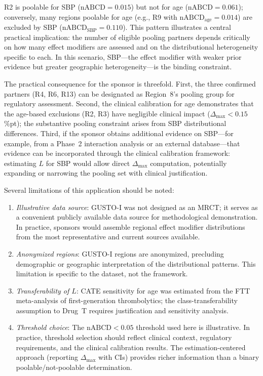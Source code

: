 R2 is poolable for SBP ($\text{nABCD} = 0.015$) but not for age ($\text{nABCD} = 0.061$); conversely, many regions poolable for age (e.g., R9 with $\text{nABCD}_{\text{age}} = 0.014$) are excluded by SBP ($\text{nABCD}_{\text{SBP}} = 0.110$). This pattern illustrates a central practical implication: the number of eligible pooling partners depends critically on how many effect modifiers are assessed and on the distributional heterogeneity specific to each. In this scenario, SBP---the effect modifier with weaker prior evidence but greater geographic heterogeneity---is the binding constraint.

The practical consequence for the sponsor is threefold. First, the three confirmed partners (R4, R6, R13) can be designated as Region~8's pooling group for regulatory assessment. Second, the clinical calibration for age demonstrates that the age-based exclusions (R2, R3) have negligible clinical impact ($\Delta_{\max} < 0.15$\%pt); the substantive pooling constraint arises from SBP distributional differences. Third, if the sponsor obtains additional evidence on SBP---for example, from a Phase~2 interaction analysis or an external database---that evidence can be incorporated through the clinical calibration framework: estimating $L$ for SBP would allow direct $\Delta_{\max}$ computation, potentially expanding or narrowing the pooling set with clinical justification.

Several limitations of this application should be noted:
\begin{enumerate}[1.]
\item \emph{Illustrative data source}: GUSTO-I was not designed as an MRCT; it serves as a convenient publicly available data source for methodological demonstration. In practice, sponsors would assemble regional effect modifier distributions from the most representative and current sources available.
\item \emph{Anonymized regions}: GUSTO-I regions are anonymized, precluding demographic or geographic interpretation of the distributional patterns. This limitation is specific to the dataset, not the framework.
\item \emph{Transferability of $L$}: CATE sensitivity for age was estimated from the FTT meta-analysis of first-generation thrombolytics; the class-transferability assumption to Drug~T requires justification and sensitivity analysis.
\item \emph{Threshold choice}: The $\text{nABCD} < 0.05$ threshold used here is illustrative. In practice, threshold selection should reflect clinical context, regulatory requirements, and the clinical calibration results. The estimation-centered approach (reporting $\Delta_{\max}$ with CIs) provides richer information than a binary poolable/not-poolable determination.
\end{enumerate}
